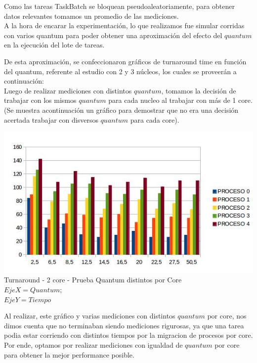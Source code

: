 \indent \indent Como las tareas TaskBatch se bloquean pseudoaleatoriamente, 
para obtener datos relevantes tomamos un promedio de las mediciones.\\
\indent A la hora de encarar la experimentación, lo que realizamos fue simular corridas con 
varios quantum para poder obtener una aproximación del efecto del $quantum$ en la ejecución del lote de tareas. 

\indent De esta aproximación, se confeccionaron gráficos de turnaround time en función del quantum, 
referente al estudio con 2 y 3 núcleos, los cuales se proveerán a continuación:\\

\indent Luego de realizar mediciones con distintos $quantum$, tomamos la decisión de trabajar con los mismos $quantum$ para cada nucleo
al trabajar con más de 1 core. (Se muestra acontinuación un gráfico para demostrar que no era una decisión acertada trabajar
con disversos $quantum$ para cada core).

\begin{center}
    	\includegraphics[width=1\textwidth]{./EJ7/turnarounddistquan.png}
	{Turnaround - 2 core - Prueba Quantum distintos por Core}\\
	{$Eje X = Quantum; $\\$ Eje Y = Tiempo$}\\
 \end{center}

\indent Al realizar, este gráfico y varias mediciones con distintos $quantum$ por core, nos dimos cuenta que no terminaban
siendo mediciones rigurosas, ya que una tarea podia estar corriendo con distintos tiempos por la migracion de procesos por core.\\
\indent Por ende, optamos por realizar mediciones con igualdad de $quantum$ por core para obtener la mejor performance posible.\\
 
